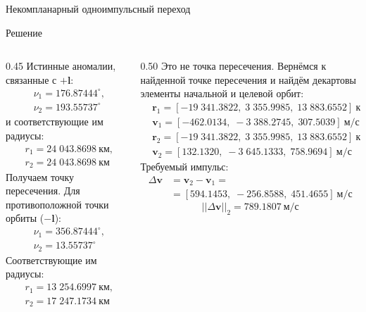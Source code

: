 \documentclass[9pt]{beamer}
\begin{document}
\begin{frame}{Некомпланарный одноимпульсный переход}
\begin{exampleblock}{Решение}
\begin{columns}[T,totalwidth=\textwidth]
  \begin{column}{0.45\textwidth}
    Истинные аномалии, связанные с $+\mathbf{l}$:
    \begin{align*}
        &\nu_1 = 176.87444^\circ, \\
        &\nu_2 = 193.55737^\circ
    \end{align*}
    и соответствующие им радиусы:
    \begin{align*}
        &r_1 = 24\;043.8698~\text{км}, \\
        &r_2 = 24\;043.8698~\text{км}
    \end{align*}
    Получаем точку пересечения.
    Для противоположной точки орбиты ($-\mathbf{l}$):
    \begin{align*}
        &\nu_1 = 356.87444^\circ, \\
        &\nu_2 = 13.55737^\circ
    \end{align*}
    Соответствующие им радиусы:
    \begin{align*}
        &r_1 = 13\;254.6997~\text{км}, \\
        &r_2 = 17\;247.1734~\text{км}
    \end{align*}
  \end{column}

  \begin{column}{0.50\textwidth}
    Это не точка пересечения. Вернёмся к найденной точке пересечения и найдём декартовы элементы начальной и целевой орбит:
    \begin{align*}
        &\textbf{r}_1 = [-19\;341.3822, \; 3\;355.9985, \; 13\;883.6552]~\text{км} \\
        &\textbf{v}_1 = [-462.0134, \; -3\;388.2745, \; 307.5039]~\text{м/с}
    \end{align*}
    \begin{align*}
        &\textbf{r}_2 = [-19\;341.3822, \; 3\;355.9985, \; 13\;883.6552]~\text{км} \\
        &\textbf{v}_2 = [132.1320, \; -3\;645.1333, \; 758.9694]~\text{м/с}
    \end{align*}
    Требуемый импульс:
    \begin{align*}
        \Delta \textbf{v} &= \textbf{v}_2 - \textbf{v}_1 = \\
        &= [594.1453, \; -256.8588, \; 451.4655]~\text{м/с}
    \end{align*}
    \begin{equation*}
        \vert \vert \Delta \textbf{v} \vert \vert_2 = 789.1807~\text{м/с}
    \end{equation*}
  \end{column}
\end{columns}
\end{exampleblock}
\end{frame}
\end{document}

